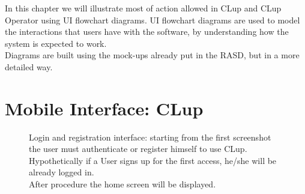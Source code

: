 In this chapter we will illustrate most of action allowed in CLup and CLup Operator using UI flowchart diagrams. UI flowchart diagrams are used to model the interactions that users have with the software, by understanding how the system is expected to work. \\
Diagrams are built using the mock-ups already put in the RASD, but in a more detailed way.

\section{Mobile Interface: CLup}

\begin{figure}[H]
  \label{login_rec}
  \centering
    \caption{Login and registration interface: starting from the first screenshot the user must authenticate or register himself to use CLup. Hypothetically if a User signs up for the first access, he/she will be already logged in. \\
    After procedure the home screen will be displayed.}
\end{figure}




